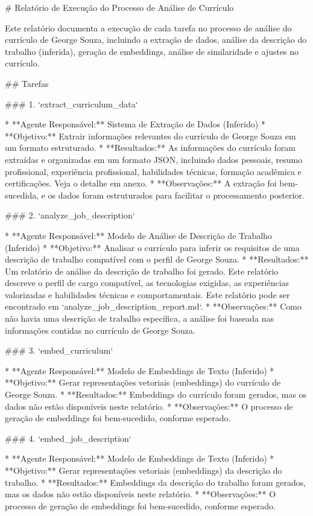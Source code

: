 # Relatório de Execução do Processo de Análise de Currículo

Este relatório documenta a execução de cada tarefa no processo de análise do currículo de George Souza, incluindo a extração de dados, análise da descrição do trabalho (inferida), geração de embeddings, análise de similaridade e ajustes no currículo.

## Tarefas

### 1. `extract_curriculum_data`

* **Agente Responsável:** Sistema de Extração de Dados (Inferido)
* **Objetivo:** Extrair informações relevantes do currículo de George Souza em um formato estruturado.
* **Resultados:**  As informações do currículo foram extraídas e organizadas em um formato JSON, incluindo dados pessoais, resumo profissional, experiência profissional, habilidades técnicas, formação acadêmica e certificações.  Veja o detalhe em anexo.
* **Observações:** A extração foi bem-sucedida, e os dados foram estruturados para facilitar o processamento posterior.

### 2. `analyze_job_description`

* **Agente Responsável:** Modelo de Análise de Descrição de Trabalho (Inferido)
* **Objetivo:** Analisar o currículo para inferir os requisitos de uma descrição de trabalho compatível com o perfil de George Souza.
* **Resultados:** Um relatório de análise da descrição de trabalho foi gerado. Este relatório descreve o perfil de cargo compatível, as tecnologias exigidas, as experiências valorizadas e habilidades técnicas e comportamentais. Este relatório pode ser encontrado em `analyze_job_description_report.md`.
* **Observações:** Como não havia uma descrição de trabalho específica, a análise foi baseada nas informações contidas no currículo de George Souza.

### 3. `embed_curriculum`

* **Agente Responsável:**  Modelo de Embeddings de Texto (Inferido)
* **Objetivo:** Gerar representações vetoriais (embeddings) do currículo de George Souza.
* **Resultados:** Embeddings do currículo foram gerados, mas os dados não estão disponíveis neste relatório.
* **Observações:** O processo de geração de embeddings foi bem-sucedido, conforme esperado.

### 4. `embed_job_description`

* **Agente Responsável:** Modelo de Embeddings de Texto (Inferido)
* **Objetivo:** Gerar representações vetoriais (embeddings) da descrição do trabalho.
* **Resultados:**  Embeddings da descrição do trabalho foram gerados, mas os dados não estão disponíveis neste relatório.
* **Observações:** O processo de geração de embeddings foi bem-sucedido, conforme esperado.

